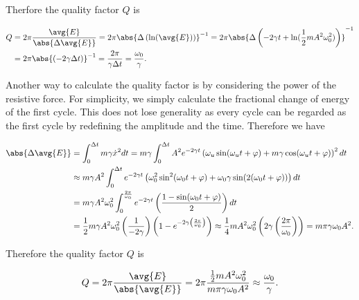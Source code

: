 \documentclass[english,a4paper,12pt]{report}
\begin{document}
Therfore the quality factor \(Q\) is 

\begin{equation}
    \begin{aligned} 
    Q &= 2\pi \frac{\avg{E} }{\abs{\Delta \avg{E} } } = 2\pi  \abs{\Delta \left( \ln (\avg{E}  ) \right)}^{-1} = 2\pi \abs{ \Delta \left(-2\gamma t + \ln (\frac{1}{2}mA^2\omega _{0}^2  )\right)}^{-1}  \\
    &= 2\pi \abs{ (-2\gamma \Delta t)}^{-1} = \frac{2\pi }{\gamma \Delta t} = \frac{\omega _{0} }{\gamma }.   
    \end{aligned} 
\end{equation}

Another way to calculate the quality factor is by considering the power of the resistive force. For simplicity, we simply calculate the fractional change of energy of the first cycle. This does not lose generality as every cycle can be regarded as the first cycle by redefining the amplitude and the time. Therefore we have

\begin{equation}
    \begin{aligned} 
    \abs{\Delta \avg{E} }  &= \int_{0}^{\Delta t} m\gamma \dot{x} ^2 dt = m\gamma \int_{0}^{\Delta t} A^2e^{-2\gamma t} \left(  \omega _{u}\sin (\omega _{u}t+\varphi  ) + m\gamma \cos (\omega _{u}t+\varphi  )  \right)^2 dt\\
    &\approx  m\gamma A^2\int_{0}^{\Delta t} e^{-2\gamma t} \left( \omega _{0}^2\sin ^2(\omega _{0}t+\varphi  ) + \omega _{0}\gamma \sin (2(\omega _{0}t+\varphi  )) \right)dt \\
    &= m\gamma A^2 \omega _{0}^2 \int_{0}^{\frac{2\pi }{\omega _{0} } } e^{-2\gamma t} \left( \frac{1-\sin (\omega _{0}t+\varphi  )}{2}  \right)dt \\
    &= \frac{1}{2}m\gamma A^2\omega _{0}^2 \left( \frac{1}{-2\gamma }  \right) \left(1- e^{-2\gamma \left( \frac{2\pi }{\omega _{0} }  \right)} \right)  \approx  \frac{1}{4}mA^2\omega _{0}^2\left(2\gamma \left( \frac{2\pi }{\omega _{0} }  \right)\right) = m\pi \gamma \omega _{0} A^2.  
    \end{aligned} 
\end{equation}

Therefore the quality factor \(Q\) is 

\begin{equation}
    Q = 2\pi \frac{\avg{E} }{\abs{\avg{E} } } = 2\pi \frac{\frac{1}{2}mA^2\omega _{0}^2}{m\pi \gamma \omega _{0}A^2 } \approx \frac{\omega _{0} }{\gamma }. 
\end{equation}
\end{document}
